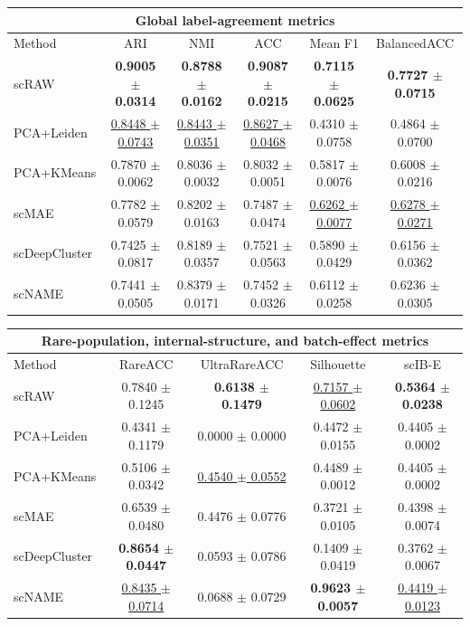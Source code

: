\documentclass[11pt,a4paper]{article}
\begin{document}
\begin{center}
{\small
\setlength{\tabcolsep}{5pt}
\renewcommand{\arraystretch}{1.05}
\begin{tabular}{lccccc}
\hline
\multicolumn{6}{c}{Global label-agreement metrics} \\
\hline
Method & ARI & NMI & ACC & Mean F1 & BalancedACC \\
\hline
scRAW & \textbf{0.9005 $\pm$ 0.0314} & \textbf{0.8788 $\pm$ 0.0162} & \textbf{0.9087 $\pm$ 0.0215} & \textbf{0.7115 $\pm$ 0.0625} & \textbf{0.7727 $\pm$ 0.0715} \\
PCA+Leiden & \underline{0.8448 $\pm$ 0.0743} & \underline{0.8443 $\pm$ 0.0351} & \underline{0.8627 $\pm$ 0.0468} & 0.4310 $\pm$ 0.0758 & 0.4864 $\pm$ 0.0700 \\
PCA+KMeans & 0.7870 $\pm$ 0.0062 & 0.8036 $\pm$ 0.0032 & 0.8032 $\pm$ 0.0051 & 0.5817 $\pm$ 0.0076 & 0.6008 $\pm$ 0.0216 \\
scMAE & 0.7782 $\pm$ 0.0579 & 0.8202 $\pm$ 0.0163 & 0.7487 $\pm$ 0.0474 & \underline{0.6262 $\pm$ 0.0077} & \underline{0.6278 $\pm$ 0.0271} \\
scDeepCluster & 0.7425 $\pm$ 0.0817 & 0.8189 $\pm$ 0.0357 & 0.7521 $\pm$ 0.0563 & 0.5890 $\pm$ 0.0429 & 0.6156 $\pm$ 0.0362 \\
scNAME & 0.7441 $\pm$ 0.0505 & 0.8379 $\pm$ 0.0171 & 0.7452 $\pm$ 0.0326 & 0.6112 $\pm$ 0.0258 & 0.6236 $\pm$ 0.0305 \\
\hline
\end{tabular}

\vspace{1em}

\begin{tabular}{lcccc}
\hline
\multicolumn{5}{c}{Rare-population, internal-structure, and batch-effect metrics} \\
\hline
Method & RareACC & UltraRareACC & Silhouette & scIB-E \\
\hline
scRAW & 0.7840 $\pm$ 0.1245 & \textbf{0.6138 $\pm$ 0.1479} & \underline{0.7157 $\pm$ 0.0602} & \textbf{0.5364 $\pm$ 0.0238} \\
PCA+Leiden & 0.4341 $\pm$ 0.1179 & 0.0000 $\pm$ 0.0000 & 0.4472 $\pm$ 0.0155 & 0.4405 $\pm$ 0.0002 \\
PCA+KMeans & 0.5106 $\pm$ 0.0342 & \underline{0.4540 $\pm$ 0.0552} & 0.4489 $\pm$ 0.0012 & 0.4405 $\pm$ 0.0002 \\
scMAE & 0.6539 $\pm$ 0.0480 & 0.4476 $\pm$ 0.0776 & 0.3721 $\pm$ 0.0105 & 0.4398 $\pm$ 0.0074 \\
scDeepCluster & \textbf{0.8654 $\pm$ 0.0447} & 0.0593 $\pm$ 0.0786 & 0.1409 $\pm$ 0.0419 & 0.3762 $\pm$ 0.0067 \\
scNAME & \underline{0.8435 $\pm$ 0.0714} & 0.0688 $\pm$ 0.0729 & \textbf{0.9623 $\pm$ 0.0057} & \underline{0.4419 $\pm$ 0.0123} \\
\hline
\end{tabular}
}
\end{center}
\end{document}

